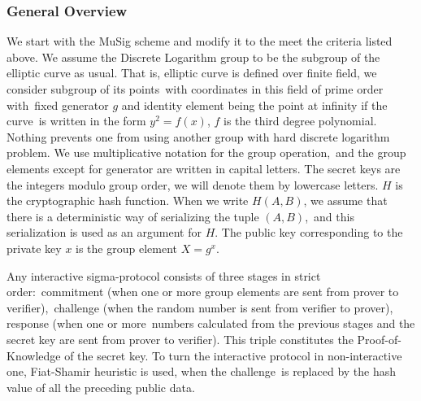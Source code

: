 \subsubsection{General Overview}

We start with the MuSig scheme and modify it to the meet the criteria listed above.
We assume the Discrete Logarithm group to be the subgroup of the elliptic curve as usual.
That is, elliptic curve is defined over finite field, we consider subgroup of its points\
with coordinates in this field of prime order with\
fixed generator $g$ and identity element being the point at infinity if the curve\
is written in the form $y^2=f(x)$, $f$ is the third degree polynomial.
Nothing prevents one from using another group with hard discrete logarithm problem.
We use multiplicative notation for the group operation,\
and the group elements except for generator are written in capital letters.
The secret keys are the integers modulo group order, we will denote them by lowercase letters.
$H$ is the cryptographic hash function.
When we write $H(A,B)$, we assume that there is a deterministic way of serializing the tuple $(A,B)$,\
and this serialization is used as an argument for $H$.
The public key corresponding to the private key $x$ is the group element $X=g^x$.

Any interactive sigma-protocol consists of three stages in strict order:\
commitment (when one or more group elements are sent from prover to verifier),\
challenge (when the random number is sent from verifier to prover), response (when one or more\
numbers calculated from the previous stages and the secret key are sent from prover to verifier).
This triple constitutes the Proof-of-Knowledge of the secret key.
To turn the interactive protocol in non-interactive one, Fiat-Shamir heuristic is used, when the challenge\
is replaced by the hash value of all the preceding public data.

